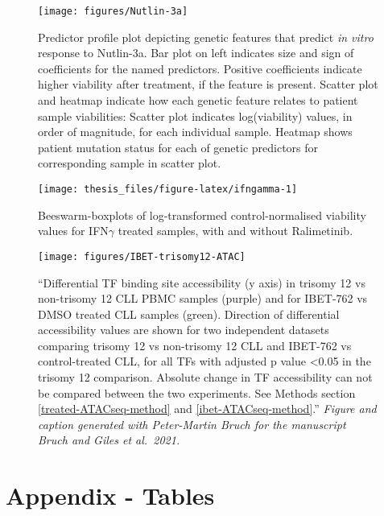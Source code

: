 \documentclass[11pt, a4paper, twosided]{book}
\begin{document}
\begin{figure}

{\centering \texttt{[image: figures/Nutlin-3a]} 

}

\caption{Predictor profile plot depicting genetic features that predict \emph{in vitro} response to Nutlin-3a. Bar plot on left indicates size and sign of coefficients for the named predictors. Positive coefficients indicate higher viability after treatment, if the feature is present. Scatter plot and heatmap indicate how each genetic feature relates to patient sample viabilities: Scatter plot indicates log(viability) values, in order of magnitude, for each individual sample. Heatmap shows patient mutation status for each of genetic predictors for corresponding sample in scatter plot.}\label{fig:NutlinPredictors}
\end{figure}

\begin{figure}

{\centering \texttt{[image: thesis\_files/figure-latex/ifngamma-1]} 

}

\caption{Beeswarm-boxplots of log-transformed control-normalised viability values for IFN\(\gamma\) treated samples, with and without Ralimetinib.}\label{fig:ifngamma}
\end{figure}





\begin{figure}

{\centering \texttt{[image: figures/IBET-trisomy12-ATAC]} 

}

\caption{``Differential TF binding site accessibility (y axis) in trisomy 12 vs non-trisomy 12 CLL PBMC samples (purple) and for IBET-762 vs DMSO treated CLL samples (green). Direction of
differential accessibility values are shown for two independent datasets comparing trisomy 12
vs non-trisomy 12 CLL and IBET-762 vs control-treated CLL, for all TFs with adjusted p value
\textless0.05 in the trisomy 12 comparison. Absolute change in TF accessibility can not be compared
between the two experiments. See Methods section \ref{treated-ATACseq-method} and \ref{ibet-ATACseq-method}.'' \emph{Figure and caption generated with Peter-Martin Bruch for the manuscript Bruch and Giles et al.~2021.}}\label{fig:ibetatac}
\end{figure}
\hypertarget{appendix---tables}{%
\chapter*{Appendix - Tables}\label{appendix---tables}}
\end{document}
